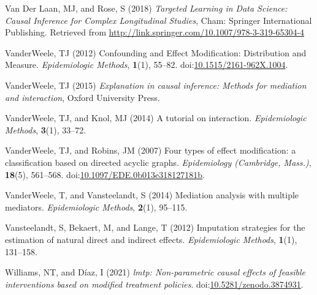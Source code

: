 \documentclass[
  single column]{article}
\newlength{\cslhangindent}
\newenvironment{CSLReferences}[2] %
 {\begin{list}{}{%
  \setlength{\itemindent}{0pt}
  \setlength{\leftmargin}{0pt}
  \setlength{\parsep}{0pt}
  \ifodd #1
   \setlength{\leftmargin}{\cslhangindent}
   \setlength{\itemindent}{-1\cslhangindent}
  \fi
  \setlength{\itemsep}{#2\baselineskip}}}
 {\end{list}}
\begin{document}
\begin{CSLReferences}{1}{0}
Van Der Laan, MJ, and Rose, S (2018) \emph{Targeted Learning in Data
Science: Causal Inference for Complex Longitudinal Studies}, Cham:
Springer International Publishing. Retrieved from
\url{http://link.springer.com/10.1007/978-3-319-65304-4}

VanderWeele, TJ (2012) Confounding and Effect Modification: Distribution
and Measure. \emph{Epidemiologic Methods}, \textbf{1}(1), 55--82.
doi:\href{https://doi.org/10.1515/2161-962X.1004}{10.1515/2161-962X.1004}.

VanderWeele, TJ (2015) \emph{Explanation in causal inference: Methods
for mediation and interaction}, Oxford University Press.

VanderWeele, TJ, and Knol, MJ (2014) A tutorial on interaction.
\emph{Epidemiologic Methods}, \textbf{3}(1), 33--72.

VanderWeele, TJ, and Robins, JM (2007) Four types of effect
modification: a classification based on directed acyclic graphs.
\emph{Epidemiology (Cambridge, Mass.)}, \textbf{18}(5), 561--568.
doi:\href{https://doi.org/10.1097/EDE.0b013e318127181b}{10.1097/EDE.0b013e318127181b}.

VanderWeele, T, and Vansteelandt, S (2014) Mediation analysis with
multiple mediators. \emph{Epidemiologic Methods}, \textbf{2}(1),
95--115.

Vansteelandt, S, Bekaert, M, and Lange, T (2012) Imputation strategies
for the estimation of natural direct and indirect effects.
\emph{Epidemiologic Methods}, \textbf{1}(1), 131--158.

Williams, NT, and Díaz, I (2021) \emph{{l}mtp: Non-parametric causal
effects of feasible interventions based on modified treatment policies}.
doi:\href{https://doi.org/10.5281/zenodo.3874931}{10.5281/zenodo.3874931}.

\end{CSLReferences}
\end{document}

